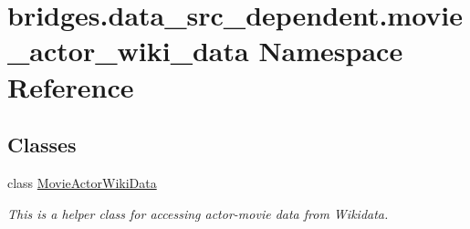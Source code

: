 \hypertarget{namespacebridges_1_1data__src__dependent_1_1movie__actor__wiki__data}{}\section{bridges.\+data\+\_\+src\+\_\+dependent.\+movie\+\_\+actor\+\_\+wiki\+\_\+data Namespace Reference}
\label{namespacebridges_1_1data__src__dependent_1_1movie__actor__wiki__data}
\subsection*{Classes}
\begin{DoxyCompactItemize}
\item 
class \hyperlink{classbridges_1_1data__src__dependent_1_1movie__actor__wiki__data_1_1_movie_actor_wiki_data}{Movie\+Actor\+Wiki\+Data}
\begin{DoxyCompactList}\small\item\em This is a helper class for accessing actor-\/movie data from Wikidata. \end{DoxyCompactList}\end{DoxyCompactItemize}
